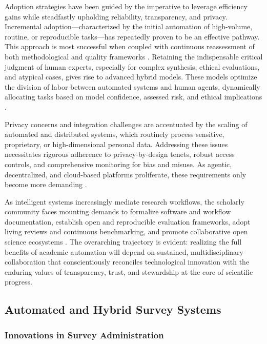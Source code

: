 Adoption strategies have been guided by the imperative to leverage efficiency gains while steadfastly upholding reliability, transparency, and privacy. Incremental adoption—characterized by the initial automation of high-volume, routine, or reproducible tasks—has repeatedly proven to be an effective pathway. This approach is most successful when coupled with continuous reassessment of both methodological and quality frameworks \cite{ref28,ref31,ref51,ref78}. Retaining the indispensable critical judgment of human experts, especially for complex synthesis, ethical evaluations, and atypical cases, gives rise to advanced hybrid models. These models optimize the division of labor between automated systems and human agents, dynamically allocating tasks based on model confidence, assessed risk, and ethical implications \cite{ref51,ref64,ref83,ref96,ref97}.

Privacy concerns and integration challenges are accentuated by the scaling of automated and distributed systems, which routinely process sensitive, proprietary, or high-dimensional personal data. Addressing these issues necessitates rigorous adherence to privacy-by-design tenets, robust access controls, and comprehensive monitoring for bias and misuse. As agentic, decentralized, and cloud-based platforms proliferate, these requirements only become more demanding \cite{ref61,ref62,ref80,ref102,ref112,ref113}.

As intelligent systems increasingly mediate research workflows, the scholarly community faces mounting demands to formalize software and workflow documentation, establish open and reproducible evaluation frameworks, adopt living reviews and continuous benchmarking, and promote collaborative open science ecosystems \cite{ref28,ref31,ref51,ref70,ref78,ref80}. The overarching trajectory is evident: realizing the full benefits of academic automation will depend on sustained, multidisciplinary collaboration that conscientiously reconciles technological innovation with the enduring values of transparency, trust, and stewardship at the core of scientific progress.

\subsection{Automated and Hybrid Survey Systems}

\subsubsection{Innovations in Survey Administration}

